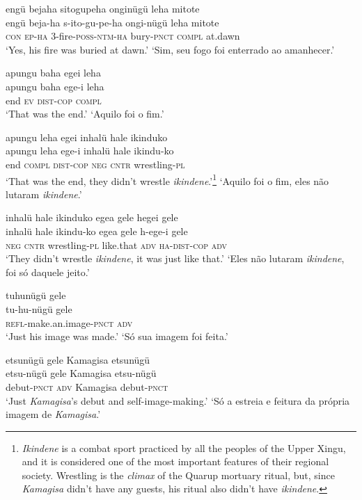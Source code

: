 \documentclass[output=paper,
modfonts,nonflat
]{langsci/langscibook}
\begin{document}
\newpage 
\ea  engü bejaha sitogupeha onginügü leha mitote\\[.3em]
\gll engü beja-ha s-ito-gu-pe-ha ongi-nügü leha mitote\\
     \textsc{con} \textsc{ep}-\textsc{ha} 3-fire-\textsc{poss}-\textsc{ntm}-\textsc{ha} bury-\textsc{pnct} \textsc{compl} at.dawn\\
\glt ‘Yes, his fire was buried at dawn.’
\glt ‘Sim, seu fogo foi enterrado ao amanhecer.’
\z

\ea  apungu baha egei leha\\[.3em]
\gll apungu baha ege-i leha\\
     end \textsc{ev} \textsc{dist}-\textsc{cop} \textsc{compl}\\
\glt ‘That was the end.’
\glt ‘Aquilo foi o fim.’
\z

\ea  apungu leha egei inhalü hale ikinduko\\[.3em]
\gll apungu leha ege-i inhalü hale ikindu-ko\\
     end \textsc{compl} \textsc{dist}-\textsc{cop} \textsc{neg} \textsc{cntr} wrestling-\textsc{pl}\\
\glt ‘That was the end, they didn't wrestle \textit{ikindene}.’\footnote{\textit{Ikindene} is a combat sport practiced by all the peoples of the Upper Xingu, and it is considered one of the most important features of their regional society. Wrestling is the \textit{climax} of the Quarup mortuary ritual, but, since \textit{Kamagisa} didn't have any guests, his ritual also didn't have \textit{ikindene}.}
\glt ‘Aquilo foi o fim, eles não lutaram \textit{ikindene}.’
\z

\ea  inhalü hale ikinduko egea gele hegei gele\\[.3em]
\gll inhalü hale ikindu-ko egea gele h-ege-i gele\\
     \textsc{neg} \textsc{cntr} wrestling-\textsc{pl} like.that \textsc{adv} \textsc{ha}-\textsc{dist}-\textsc{cop} \textsc{adv}\\
\glt ‘They didn't wrestle \textit{ikindene}, it was just like that.’
\glt ‘Eles não lutaram \textit{ikindene}, foi só daquele jeito.’
\z

\ea  tuhunügü gele\\[.3em]
\gll tu-hu-nügü gele\\
     \textsc{refl}-make.an.image-\textsc{pnct} \textsc{adv}\\
\glt ‘Just his image was made.’
\glt ‘Só sua imagem foi feita.’
\z

\newpage 
\ea  etsunügü gele Kamagisa etsunügü\\[.3em]
\gll etsu-nügü gele Kamagisa etsu-nügü\\
     debut-\textsc{pnct} \textsc{adv} Kamagisa debut-\textsc{pnct}\\
\glt ‘Just \textit{Kamagisa}'s debut and self-image-making.’
\glt ‘Só a estreia e feitura da própria imagem de \textit{Kamagisa}.’
\z
\end{document}
